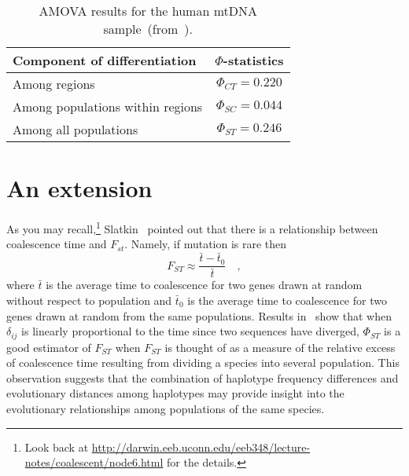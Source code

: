\documentclass[12pt]{article}
\begin{document}
\begin{table}
\begin{center}
\begin{tabular}{lc}
\hline\hline
Component of differentiation     & $\Phi$-statistics \\
\hline
Among regions                    & $\Phi_{CT} = 0.220$ \\
Among populations within regions & $\Phi_{SC} = 0.044$ \\
Among all populations            & $\Phi_{ST} = 0.246$ \\
\hline
\end{tabular}
\end{center}
\caption{AMOVA results for the human mtDNA
  sample~(from~\cite{Excoffier-etal92}).}\label{table:amova-results}
\end{table}

\section*{An extension}

As you may recall,\footnote{Look back at
  \url{http://darwin.eeb.uconn.edu/eeb348/lecture-notes/coalescent/node6.html}
  for the details.}
Slatkin~\cite{Slatkin91-coalescence} pointed out that there is a
relationship between coalescence time and $F_{st}$. Namely, if
mutation is rare then
\[
F_{ST} \approx \frac{\bar t - \bar t_0}{\bar t} \quad ,
\]
where $\bar t$ is the average time to coalescence for two genes drawn
at random without respect to population and $\bar t_0$ is the average
time to coalescence for two genes drawn at random from the same
populations. Results in~\cite{Holsinger-MasonGamer96} show that when
$\delta_{ij}$ is linearly proportional to the time since two sequences
have diverged, $\Phi_{ST}$ is a good estimator of $F_{ST}$ when
$F_{ST}$ is thought of as a measure of the relative excess of
coalescence time resulting from dividing a species into several
population. This observation suggests that the combination of
haplotype frequency differences and evolutionary distances among
haplotypes may provide insight into the evolutionary relationships
among populations of the same species.




\ccLicense
\end{document}
